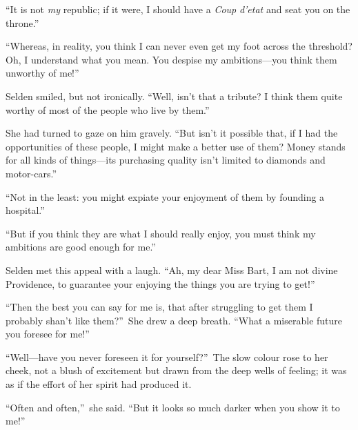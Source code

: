 \documentclass[12pt,a4paper]{book}
\begin{document}
``It is not \textit{my} republic; if it were, I should have a \textit{Coup} \textit{d'etat}
and seat you on the throne.''





``Whereas, in reality, you think I can never even get my foot
across the threshold? Oh, I understand what you mean. You despise
my ambitions---you think them unworthy of me!''





Selden smiled, but not ironically. ``Well, isn't that a tribute? I
think them quite worthy of most of the people who live by them.''





She had turned to gaze on him gravely. ``But isn't it possible
that, if I had the opportunities of these people, I might make a
better use of them? Money stands for all kinds of things---its
purchasing quality isn't limited to diamonds and motor-cars.''






``Not in the least: you might expiate your enjoyment of them by
founding a hospital.''





``But if you think they are what I should really enjoy, you must
think my ambitions are good enough for me.''





Selden met this appeal with a laugh. ``Ah, my dear Miss Bart, I am
not divine Providence, to guarantee your enjoying the things you
are trying to get!''





``Then the best you can say for me is, that after struggling to
get them I probably shan't like them?''\ She drew a deep breath. 
``What a miserable future you foresee for me!''





``Well---have you never foreseen it for yourself?''\ The slow colour
rose to her cheek, not a blush of excitement but drawn from the
deep wells of feeling; it was as if the effort of her spirit had
produced it.





``Often and often,''\ she said. ``But it looks so much darker when
you show it to me!''
\end{document}
